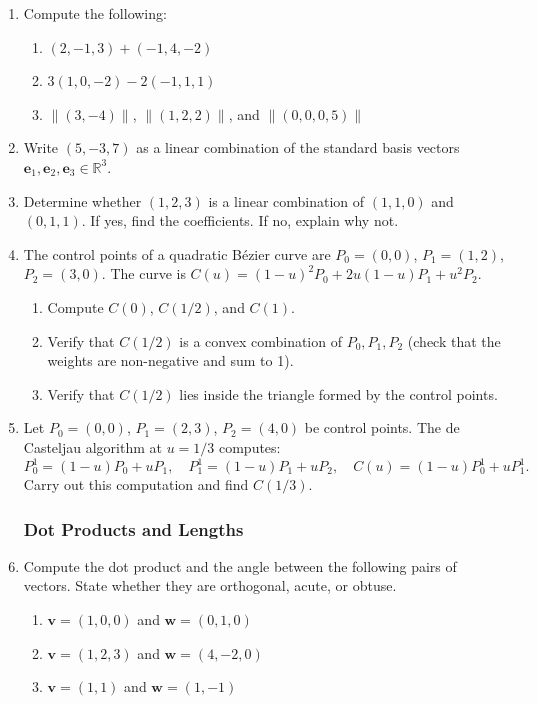 \begin{enumerate}

\item Compute the following:
\begin{enumerate}
  \item $(2, -1, 3) + (-1, 4, -2)$
  \item $3(1, 0, -2) - 2(-1, 1, 1)$
  \item $\|(3, -4)\|$, $\|(1, 2, 2)\|$, and $\|(0, 0, 0, 5)\|$
\end{enumerate}

\item Write $(5, -3, 7)$ as a linear combination of the standard basis
vectors $\mathbf{e}_1, \mathbf{e}_2, \mathbf{e}_3 \in \mathbb{R}^3$.

\item Determine whether $(1, 2, 3)$ is a linear combination of
$(1, 1, 0)$ and $(0, 1, 1)$.
If yes, find the coefficients. If no, explain why not.

\item The control points of a quadratic B\'{e}zier curve are
$P_0 = (0,0)$, $P_1 = (1,2)$, $P_2 = (3,0)$.
The curve is $C(u) = (1-u)^2 P_0 + 2u(1-u)P_1 + u^2 P_2$.
\begin{enumerate}
  \item Compute $C(0)$, $C(1/2)$, and $C(1)$.
  \item Verify that $C(1/2)$ is a convex combination of $P_0, P_1, P_2$
        (check that the weights are non-negative and sum to 1).
  \item Verify that $C(1/2)$ lies inside the triangle formed by the control points.
\end{enumerate}

\item Let $P_0 = (0,0)$, $P_1 = (2,3)$, $P_2 = (4,0)$ be control points.
The de Casteljau algorithm at $u = 1/3$ computes:
\[
  P_0^1 = (1-u)P_0 + uP_1, \quad P_1^1 = (1-u)P_1 + uP_2, \quad
  C(u) = (1-u)P_0^1 + uP_1^1.
\]
Carry out this computation and find $C(1/3)$.

\subsubsection*{Dot Products and Lengths}

\item Compute the dot product and the angle between the following pairs of vectors.
State whether they are orthogonal, acute, or obtuse.
\begin{enumerate}
  \item $\mathbf{v} = (1,0,0)$ and $\mathbf{w} = (0,1,0)$
  \item $\mathbf{v} = (1,2,3)$ and $\mathbf{w} = (4,-2,0)$
  \item $\mathbf{v} = (1,1)$ and $\mathbf{w} = (1,-1)$
\end{enumerate}


\end{enumerate}
